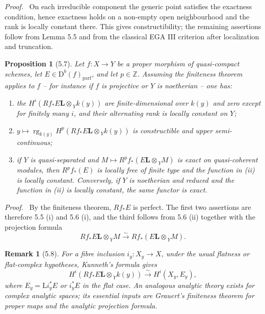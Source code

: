 \documentclass[13pt]{extarticle}
\newcommand{\ZZ}{\mathbb Z}
\newcommand{\D}{\mathrm D}
\newcommand{\rg}{\operatorname{rg}}
\newcommand{\Ltens}{\mathbin{\mathbf L\!\otimes}}
\newcommand{\iso}{\xrightarrow{\sim}}
\newenvironment{prooftext}[1][Proof]{\par\noindent\emph{#1.}\ }{\par\medskip}
\newtheorem*{proposition*}{Proposition}
\newtheorem*{remark*}{Remark}
\begin{document}
\begin{prooftext}
On each irreducible component the generic point satisfies the exactness condition, hence exactness holds on a non-empty open neighbourhood and the rank is locally constant there. This gives constructibility; the remaining assertions follow from Lemma 5.5 and from the classical EGA III criterion after localization and truncation.
\end{prooftext}

\begin{proposition*}[5.7]
Let $f:X\to Y$ be a proper morphism of quasi-compact schemes, let $E\in\D^b(f)_{\mathrm{parf}}$, and let $p\in\ZZ$. Assuming the finiteness theorem applies to $f$ -- for instance if $f$ is projective or $Y$ is noetherian -- one has:
\begin{enumerate}[label=(\roman*)]
\item the $H^i(Rf_*E\Ltens_Y k(y))$ are finite-dimensional over $k(y)$ and zero except for finitely many $i$, and their alternating rank is locally constant on $Y$;
\item $y\mapsto\rg_{k(y)}H^p(Rf_*E\Ltens_Y k(y))$ is constructible and upper semi-continuous;
\item if $Y$ is quasi-separated and $M\mapsto R^pf_*(E\Ltens_Y M)$ is exact on quasi-coherent modules, then $R^pf_*(E)$ is locally free of finite type and the function in (ii) is locally constant. Conversely, if $Y$ is noetherian and reduced and the function in (ii) is locally constant, the same functor is exact.
\end{enumerate}
\end{proposition*}

\begin{prooftext}
By the finiteness theorem, $Rf_*E$ is perfect. The first two assertions are therefore 5.5 (i) and 5.6 (i), and the third follows from 5.6 (ii) together with the projection formula
\[
Rf_*E\Ltens_Y M\iso Rf_*(E\Ltens_Y M).
\]
\end{prooftext}

\begin{remark*}[5.8]
For a fibre inclusion $i_y:X_y\to X$, under the usual flatness or flat-complex hypotheses, Kunneth's formula gives
\[
H^i(Rf_*E\Ltens_Y k(y))\iso H^i(X_y,E_y),
\]
where $E_y=\mathrm L i_y^*E$ or $i_y^*E$ in the flat case. An analogous analytic theory exists for complex analytic spaces; its essential inputs are Grauert's finiteness theorem for proper maps and the analytic projection formula.
\end{remark*}
\end{document}
